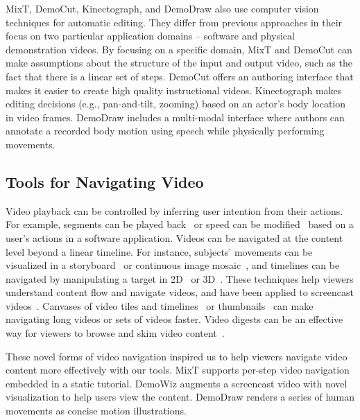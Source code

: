 MixT, DemoCut, Kinectograph, and DemoDraw also use computer vision techniques for automatic editing. They differ from previous approaches in their focus on two particular application domains -- software and physical demonstration videos.
%
By focusing on a specific domain, MixT and DemoCut can make assumptions about the structure of the input and output video, such as the fact that there is a linear set of steps. DemoCut offers an authoring interface that makes it easier to create high quality instructional videos.
%
Kinectograph makes editing decisions (e.g., pan-and-tilt, zooming) based on an actor's body location in video frames.
%
DemoDraw includes a multi-modal interface where authors can annotate a recorded body motion using speech while physically performing movements.



\subsection{Tools for Navigating Video}
Video playback can be controlled by inferring user intention from their actions. For example, segments can be played back~\cite{Pongnumkul:2011ju} or speed can be modified~\cite{Cheng:2009:SUV:1518701.1518823} based on a user's actions in a software application.
%
Videos can be navigated at the content level beyond a linear timeline. For instance, subjects' movements can be visualized in a storyboard~\cite{goldman2006schematic} or continuous image mosaic~\cite{Teodosio:2005:SS:1047936.1047940}, and timelines can be navigated by manipulating a target in 2D~\cite{Dragicevic:2008:VBD:1357054.1357096,Goldman:2008:VOA:1449715.1449719,Karrer:2008:DDM:1357054.1357097} or 3D~\cite{Nguyen:2013:DMV:2470654.2466150}.
%
These techniques help viewers understand content flow and navigate videos, and have been applied to screencast videos~\cite{Denoue:2013:RDM:2451176.2451190,Nguyen:2015:MST:2702123.2702209}.
%
Canvases of video tiles and timelines~\cite{Al-Hajri:2014:VPH:2611105.2557106} or thumbnails~\cite{Matejka:2013:SIO:2470654.2466149} can make navigating long videos or sets of videos faster. Video digests can be an effective way for viewers to browse and skim video content~\cite{Pavel:2014:VDB:2642918.2647400}.

These novel forms of video navigation inspired us to help viewers navigate video content more effectively with our tools.
%
MixT supports per-step video navigation embedded in a static tutorial.
%
DemoWiz augments a screencast video with novel visualization to help users view the content.
%
DemoDraw renders a series of human movements as concise motion illustrations.

